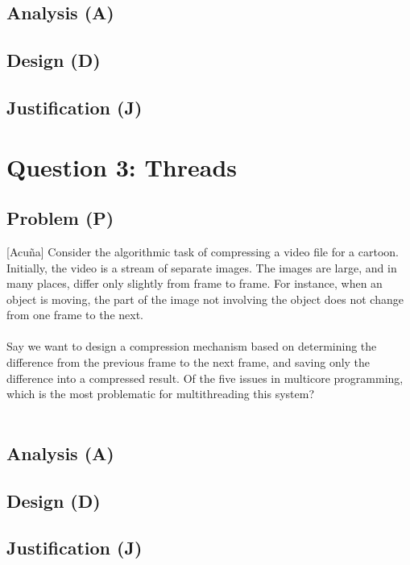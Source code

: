 \documentclass[12pt]{article}
\begin{document}
        \subsection{Analysis (A)}

        \subsection{Design (D)}

        \subsection{Justification (J)}

    \section{Question 3: Threads}
        \subsection{Problem (P)}
        [Acuña] Consider the algorithmic task of compressing a video file for a cartoon. Initially, the video is a stream of separate images. The 
        images are large, and in many places, differ only slightly from frame to frame. For instance, when an object is moving, the part of the image
        not involving the object does not change from one frame to the next. \\
        \\
        Say we want to design a compression mechanism based on determining the difference from the previous frame to the next frame, and saving only 
        the difference into a compressed result. Of the five issues in multicore programming, which is the most problematic for multithreading this system? \\
        \\
        \subsection{Analysis (A)}

        \subsection{Design (D)}

        \subsection{Justification (J)}
\end{document}
